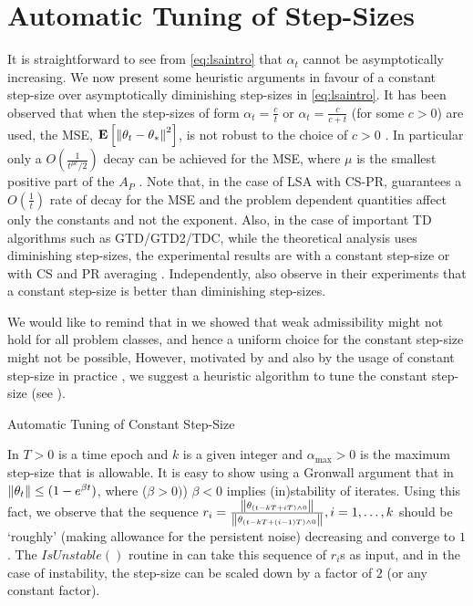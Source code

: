 \section{Automatic Tuning of Step-Sizes}
It is straightforward to see from \eqref{eq:lsaintro} that $\alpha_t$ cannot be asymptotically increasing. We now present some heuristic arguments in favour of a constant step-size over asymptotically diminishing step-sizes in \eqref{eq:lsaintro}.
It has been observed that when the step-sizes of form $\alpha_t=\frac{c}{t}$ or $\alpha_t=\frac{c}{c+t}$ (for some $c>0$) are used, the MSE, $\mathbf{E}\left[\left\| \theta_t-\theta_*\right\|^2\right]$, is not robust to the choice of $c>0$ \cite{korda-prashanth,bach-moulines}. In particular only a $O(\frac{1}{t^{\mu c}/2})$ decay can be achieved for the MSE, where $\mu$ is the smallest positive part of the $A_P$ \cite{bach-moulines}. Note that, in the case of LSA with CS-PR,  guarantees a $O(\frac{1}{t})$ rate of decay for the MSE and the problem dependent quantities affect only the constants and not the exponent. Also, in the case of important TD algorithms such as GTD/GTD2/TDC, while the theoretical analysis uses diminishing step-sizes, the experimental results are with a constant step-size or with CS and PR averaging \cite{gtd2,gtdmp}. Independently, \citet{dann} also observe in their experiments that a constant step-size is better than diminishing step-sizes.\par
We would like to remind that in  we showed that weak admissibility might not hold for all problem classes, and hence a uniform choice for the constant step-size might not be possible, However, motivated by  and also by the usage of constant step-size in practice \cite{dann,gtd2,gtdmp}, we suggest a heuristic algorithm to tune the constant step-size (see ).
\begin{algorithm}[H]
\caption{Automatic Tuning of Constant Step-Size}
\begin{algorithmic}[1]
\ENDIF
\ENDFOR
\end{algorithmic}
\label{alg:tuning}
\end{algorithm}
In  $T>0$ is a time epoch and $k$ is a given integer and $\alpha_{\max}>0$ is the maximum step-size that is allowable. It is easy to show using a Gronwall argument that in  $\left\| \theta_t\right\|\leq (1-e^{\beta t})$, where ($\beta>0)$) $\beta<0$ implies (in)stability of iterates. Using this fact, we observe that the sequence $r_i=\frac{\left\| \theta_{(t-kT+iT)\wedge 0}\right\|}{\left\| \theta_{(t-kT+(i-1)T)\wedge 0}\right\|},i=1,\ldots,k$ should be `roughly' (making allowance for the persistent noise) decreasing and converge to $1$. The $IsUnstable()$ routine in  can take this sequence of $r_i$s as input, and in the case of instability, the step-size can be scaled down by a factor of $2$ (or any constant factor).
